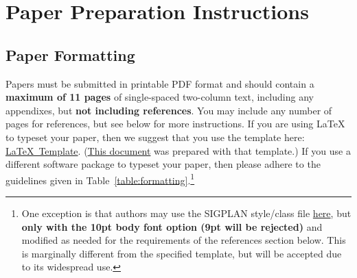 \documentclass[pageno]{jpaper}
\begin{document}


\section{Paper Preparation Instructions}

\subsection{Paper Formatting}

Papers must be submitted in printable PDF format and should contain a
{\bf maximum of 11 pages} of single-spaced two-column text, including any
appendixes, but {\bf not
  including references}.  You may include any number of pages for
references, but see below for more instructions.  If you are using
\LaTeX~\cite{lamport94} to typeset your paper, then we suggest that
you use the template here:
\href{https://asplos-conference.org/wp-content/uploads/2018/06/asplos19-latex-template.tar.gz}{\LaTeX~Template}.
(\href{https://asplos-conference.org/wp-content/uploads/2018/06/asplos19-template.pdf}{This
  document} was prepared with that template.)  If you use a different
software package to typeset your paper, then please adhere to the
guidelines given in Table~\ref{table:formatting}.\footnote{One
  exception is that authors may use the SIGPLAN style/class file
  \href{http://classic.sigplan.org/sigplanconf.cls}{here}, but {\bf
    only with the 10pt body font option (9pt will be rejected)} and
  modified as needed for the requirements of the references section
  below.  This is marginally different from the specified template,
  but will be accepted due to its widespread use.}
\end{document}
